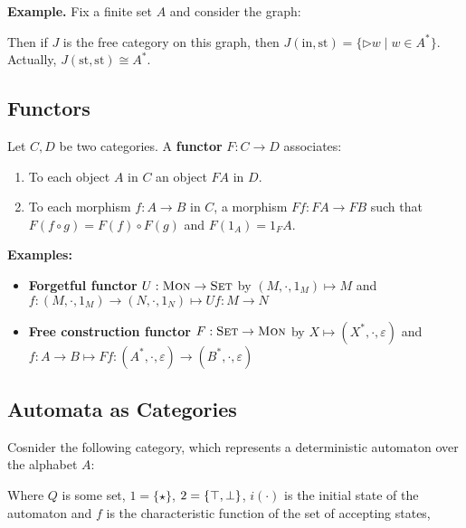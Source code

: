 \textbf{Example.} Fix a finite set $A$ and consider the graph:
\begin{figure}
\end{figure}

Then if $J$ is the free category on this graph, then $J(\mathrm{in, st}) = \{\rhd w \mid w\in A^*\}$.
Actually, $J(\mathrm{st, st}) \cong A^*$.


\subsection{Functors}
Let $C, D$ be two categories. A \textbf{functor} $F: C \to D$ associates: 
\begin{enumerate}
\item To each object $A$ in $C$ an object $FA$ in $D$.
\item To each morphism $f: A \to B$ in $C$, a morphism $Ff : FA \to FB$ such that $F (f \circ g) = F(f) \circ F(g)$ and $F(1_A) = 1_FA$.
\end{enumerate}

\textbf{Examples:}
\begin{itemize}
\item \textbf{Forgetful functor} $U : \text{\textsc{Mon}} \to \text{\textsc{Set}}$ by $(M, \cdot, 1_M) \mapsto M$ and 
$f: (M, \cdot, 1_M) \to (N, \cdot, 1_N) \mapsto Uf: M \to N$
\item \textbf{Free construction functor} $F : \text{\textsc{Set}} \to \text{\textsc{Mon}}$ by $X \mapsto (X^*, \cdot, \varepsilon)$
and $f: A \to B \mapsto Ff: (A^*, \cdot, \varepsilon) \to (B^*, \cdot, \varepsilon)$
\end{itemize}

\subsection{Automata as Categories}

Cosnider the following category, which represents a deterministic automaton over the alphabet $A$:
\begin{figure}
\end{figure}

Where $Q$ is some set, $1 = \{\star\}$, $2 = \{\top, \perp\}$, $i(\cdot)$ is the initial state of the automaton and $f$ is the
characteristic function of the set of accepting states,
